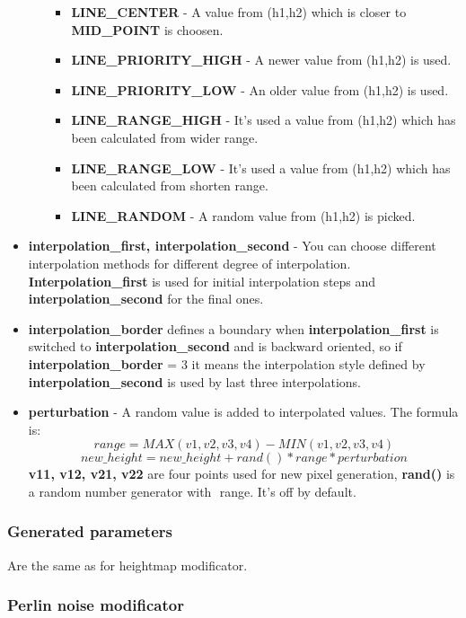 \documentclass[9pt]{article}
\begin{document}
\begin{itemize}
\begin{itemize}
\begin{itemize}
\item{\bf LINE\_CENTER} - A value from (h1,h2) which is closer to {\bf MID\_POINT} is choosen.
\item{\bf LINE\_PRIORITY\_HIGH} - A newer value from (h1,h2) is used.
\item{\bf LINE\_PRIORITY\_LOW} - An older value from (h1,h2) is used.
\item{\bf LINE\_RANGE\_HIGH} - It's used a value from (h1,h2) which has been calculated
from wider range.
\item{\bf LINE\_RANGE\_LOW} - It's used a value from (h1,h2) which has been calculated
from shorten range.
\item{\bf LINE\_RANDOM} - A random value from (h1,h2) is picked.
\end{itemize}
\end{itemize}
\item{\bf interpolation\_first, interpolation\_second}
- You can choose different interpolation methods for different degree of interpolation. 
{\bf Interpolation\_first} is used for initial interpolation steps and 
{\bf interpolation\_second} for the final ones. 
\item{\bf interpolation\_border}
defines a boundary when {\bf interpolation\_first} is switched to {\bf interpolation\_second} 
and is backward oriented, so if {\bf interpolation\_border} = 3 it means the interpolation
style defined by {\bf interpolation\_second} is used by last three interpolations.
\item{\bf perturbation} - A random value is added to interpolated values. The formula is:
\[
range = MAX(v1, v2, v3, v4) - MIN(v1, v2, v3, v4)
\]
\[
new\_height = new\_height + rand() * range * perturbation
\]
{\bf v11, v12, v21, v22} are four points used for new pixel generation, 
{\bf rand()} is a random number generator with \begin{math}<-1,1>\end{math} range.
It's off by default.
\end{itemize}

\subsubsection*{Generated parameters}

Are the same as for heightmap modificator.

\newpage
\subsubsection{Perlin noise modificator}
\end{document}
